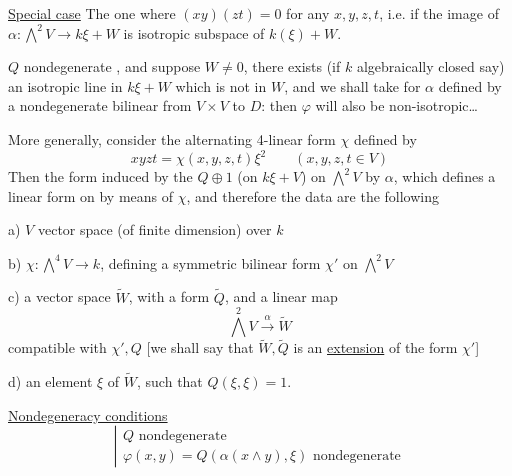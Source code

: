 \uline{Special case} The one where $(xy)(zt)=0$ for any $x,y,z,t$, i.e.
\margin{[i.e. $(H^1)H^3=0$ in $H^4$ !]}
if the image of $\alpha:\bigwedge^2V\longrightarrow k\xi+W$ is   isotropic subspace of $k(\xi)+W$.

$Q$ nondegenerate , and suppose $W\neq0$, there exists (if $k$  algebraically closed say) an isotropic line  in $k\xi+W$ which is not in $W$, and we shall take for $\alpha$  defined by a nondegenerate  bilinear   from $V\times V$ to $D$: then $\varphi$ will also be non-isotropic\ldots


More generally, consider the alternating 4-linear form $\chi$ defined by
\[
xyzt=\chi(x,y,z,t)\xi^2\qquad(x,y,z,t\in V)
\]
Then the  form induced by the  $Q\oplus1$ (on $k\xi+V$) on $\bigwedge^2 V$ by $\alpha$, which defines a  linear form on
by means of $\chi$, and therefore the data are the following

a) $V$ vector space (of finite dimension) over $k$


b) $\chi:\bigwedge^4V\longrightarrow k$, defining a symmetric bilinear form $\chi'$ on $\bigwedge^2V$

c) a vector space $\widetilde W$, with a  form $\widetilde Q$, and a linear map
\[
\bigwedge^2V\xrightarrow{\alpha}\widetilde W
\]
compatible with $\chi',Q$ [we shall say that $\widetilde W,\widetilde Q$ is an \uline{extension} of the form $\chi'$]

d) an element $\xi$ of $\widetilde W$, such that $Q(\xi,\xi)=1$.

\uline{Nondegeneracy conditions}
\[
\left|\begin{array}{l}
Q\text{ nondegenerate}\\
\varphi(x,y)=Q(\alpha(x\wedge y),\xi)\text{ nondegenerate}
\end{array}\right.
\]

